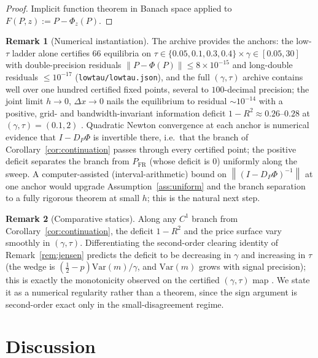 \documentclass[11pt]{article}
\theoremstyle{definition}
\newtheorem{remark}{Remark}
\newcommand{\norm}[1]{\left\lVert #1 \right\rVert}
\begin{document}
\begin{proof}
Implicit function theorem in Banach space applied to
$F(P,z):=P-\Phi_z(P)$.
\end{proof}

\begin{remark}[Numerical instantiation]\label{rem:numerics}
The archive provides the anchors: the low-$\tau$ ladder alone certifies
$66$ equilibria on $\tau\in\{0.05,0.1,0.3,0.4\}\times
\gamma\in[0.05,30]$ with double-precision residuals
$\norm{P-\Phi(P)}\le 8\times10^{-15}$ and long-double residuals
$\le10^{-17}$ (\texttt{lowtau/lowtau.json}), and the full
$(\gamma,\tau)$ archive contains well over one hundred certified fixed
points, several to $100$-decimal precision; the joint limit
$h\to0$, $\Delta x\to0$ nails the equilibrium to residual
$\sim10^{-14}$ with a positive, grid- and bandwidth-invariant information
deficit $1-R^2\approx0.26$--$0.28$ at $(\gamma,\tau)=(0.1,2)$
\cite{REZN}. Quadratic Newton convergence at each anchor is numerical
evidence that $I-D_P\Phi$ is invertible there, i.e.\ that the branch of
Corollary~\ref{cor:continuation} passes through every certified point; the
positive deficit separates the branch from $P_{\mathrm{FR}}$ (whose deficit
is $0$) uniformly along the sweep. A computer-assisted (interval-arithmetic)
bound on $\norm{(I-D_P\Phi)^{-1}}$ at one anchor would upgrade
Assumption~\ref{ass:uniform} and the branch separation to a fully rigorous
theorem at small $h$; this is the natural next step.
\end{remark}

\begin{remark}[Comparative statics]
Along any $C^1$ branch from Corollary~\ref{cor:continuation}, the deficit
$1-R^2$ and the price surface vary smoothly in $(\gamma,\tau)$.
Differentiating the second-order clearing identity of
Remark~\ref{rem:jensen} predicts the deficit to be decreasing in $\gamma$
and increasing in $\tau$ (the wedge is
$(\tfrac12-p)\mathrm{Var}(m)/\gamma$, and $\mathrm{Var}(m)$ grows with
signal precision); this is exactly the monotonicity observed on the
certified $(\gamma,\tau)$ map \cite{REZN}. We state it as a numerical
regularity rather than a theorem, since the sign argument is second-order
exact only in the small-disagreement regime.
\end{remark}

\section{Discussion}\label{sec:discussion}
\end{document}
